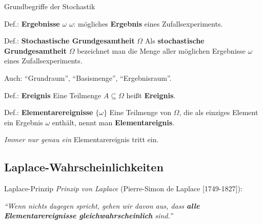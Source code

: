 \documentclass[
  10pt,
  ignorenonframetext,
]{beamer}
\begin{document}
\begin{frame}{Grundbegriffe der Stochastik}
\label{grundbegriffe-der-stochastik}
\begin{block}{Def.: \textbf{Ergebnisse} \(\omega\)}
\label{def.-ergebnisse-omega}
\(\omega\): mögliches \textbf{Ergebnis} eines Zufallsexperiments.
\end{block}

\begin{block}{Def.: \textbf{Stochastische Grundgesamtheit} \(\Omega\)}
\label{def.-stochastische-grundgesamtheit-omega}
Als \textbf{stochastische Grundgesamtheit} \(\Omega\) bezeichnet man die
Menge aller möglichen Ergebnisse \(\omega\) eines Zufallsexperiments.
\end{block}

Auch: ``Grundraum'', ``Basismenge'', ``Ergebnisraum''.

\begin{block}{Def.: \textbf{Ereignis}}
\label{def.-ereignis}
Eine Teilmenge \(A \subseteq \Omega\) heißt \textbf{Ereignis}.
\end{block}

\begin{block}{Def.: \textbf{Elementarereignisse} \(\{\omega\}\)}
\label{def.-elementarereignisse-omega}
Eine Teilmenge von \(\Omega\), die als einziges Element ein Ergebnis
\(\omega\) enthält, nennt man \textbf{Elementareignis}.
\end{block}

\emph{Immer nur genau ein} Elementarereignis tritt ein.

\end{frame}

\subsection{Laplace-Wahrscheinlichkeiten}\label{laplace-wahrscheinlichkeiten}

\begin{frame}{Laplace-Prinzip}
\label{laplace-prinzip}
\emph{Prinzip von Laplace} (Pierre-Simon de Laplace {[}1749-1827{]}):

\emph{``Wenn nichts dagegen spricht, gehen wir davon aus, dass
\textbf{alle Elementarereignisse gleichwahrscheinlich} sind.''}
\end{frame}
\end{document}
